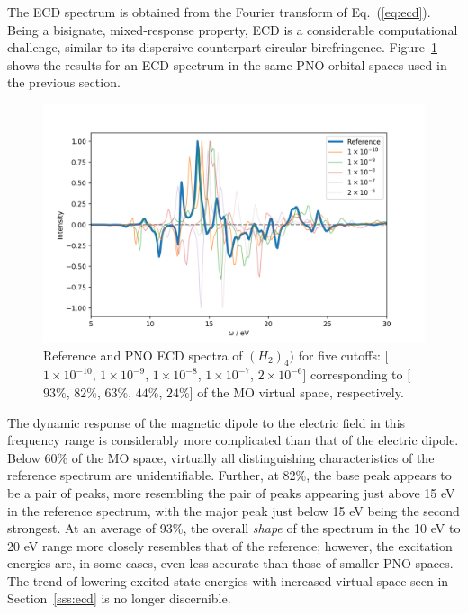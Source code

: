 The ECD spectrum is obtained from the Fourier transform of Eq.~(\ref{eq:ecd}).
Being a bisignate, mixed-response property, ECD is a considerable computational
challenge, similar to its dispersive counterpart circular birefringence. 
Figure~\ref{fig:pno_ecd} shows the results for an ECD spectrum in the same PNO 
orbital spaces used in the previous section.
\begin{figure} 
    \centering
    \includegraphics[scale=.6]{p3/figures/pno_ecd.png}
    \caption{Reference and PNO ECD spectra of $(H_2)_4)$ for five cutoffs: 
    [$1\times 10^{-10}$, $1\times 10^{-9}$, $1\times 10^{-8}$, $1\times 10^{-7}$, 
    $2\times 10^{-6}$] corresponding to [$93\%$, $82\%$, $63\%$, $44\%$, $24\%$]
    of the MO virtual space, respectively.}
    \label{fig:pno_ecd}
\end{figure}
The dynamic response of the magnetic dipole to the electric field in this frequency 
range is considerably more complicated than that of the electric dipole. Below 60\% of
the MO space, virtually all distinguishing characteristics of the reference 
spectrum are unidentifiable. Further, at 82\%, the base peak appears to be a pair of 
peaks, more resembling the pair of peaks appearing just above 15 eV in the 
reference spectrum, with the major peak just below 15 eV being the second strongest.
At an average of 93\%, the overall \textit{shape} of the spectrum in the 10 eV to 
20 eV range more closely resembles that of the reference; however, the excitation
energies are, in some cases, even less accurate than those of smaller PNO spaces.
The trend of lowering excited state energies with increased virtual space seen in 
Section~\ref{sss:ecd} is no longer discernible. 

